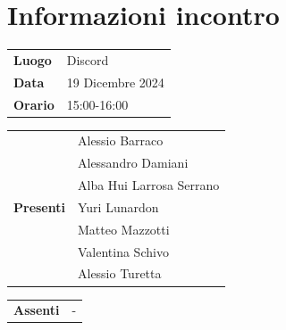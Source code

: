 \section{Informazioni incontro}
\vspace{0.25cm}
\begin{tabular}{p{1.75cm} | l}
    \textbf{Luogo} & Discord\\
    \textbf{Data} & 19 Dicembre 2024\\
    \textbf{Orario} & 15:00-16:00\\
\end{tabular}

\vspace{0.5cm}
\noindent
\begin{tabular}{p{1.75cm} | l}
    \multirow{7}{*}{\textbf{Presenti}}
        & Alessio Barraco\\
        & Alessandro Damiani \\ %
        & Alba Hui Larrosa Serrano\\
        & Yuri Lunardon\\
        & Matteo Mazzotti\\
        & Valentina Schivo\\
        & Alessio Turetta
\end{tabular}

\vspace{0.5cm}
\noindent
\begin{tabular}{p{1.75cm} | l}
    \multirow{1}{*}{\textbf{Assenti}}
        & -\\
\end{tabular}

\vspace{0.5cm}
\noindent
